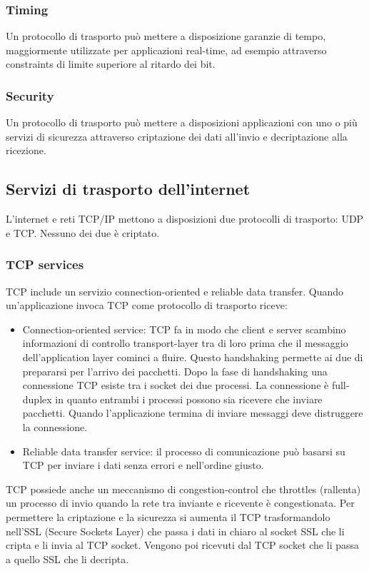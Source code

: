 \subsubsection{Timing}
Un protocollo di trasporto pu\`o mettere a disposizione garanzie di tempo, maggiormente utilizzate per applicazioni real-time, ad esempio attraverso constraints di limite superiore al ritardo dei bit. 
\subsubsection{Security} 
Un protocollo di trasporto pu\`o mettere a disposizioni applicazioni con uno o pi\`u servizi di sicurezza attraverso criptazione dei dati all'invio e decriptazione alla ricezione. 
\subsection{Servizi di trasporto dell'internet}
L'internet e reti TCP/IP mettono a disposizioni due protocolli di trasporto: UDP e TCP.  Nessuno dei due \`e criptato.
\subsubsection{TCP services}
TCP include un servizio connection-oriented e reliable data transfer. Quando un'applicazione invoca TCP come protocollo di trasporto riceve:
\begin{itemize}
\item Connection-oriented service: TCP fa in modo che client e server scambino informazioni di controllo transport-layer tra di loro prima che il messaggio dell'application layer cominci a fluire. Questo 
handshaking permette ai due di prepararsi per l'arrivo dei pacchetti. Dopo la fase di handshaking una connessione TCP esiste tra i socket dei due processi. La connessione \`e full-duplex in quanto 
entrambi i processi possono sia ricevere che inviare pacchetti. Quando l'applicazione termina di inviare messaggi deve distruggere la connessione.
\item Reliable data transfer service: il processo di comunicazione pu\`o basarsi su TCP per inviare i dati senza errori e nell'ordine giusto. 
\end{itemize}
TCP possiede anche un meccanismo di congestion-control che throttles (rallenta) un processo di invio quando la rete tra inviante e ricevente \`e congestionata. Per permettere la criptazione e la sicurezza
si aumenta il TCP trasformandolo nell'SSL (Secure Sockets Layer) che passa i dati in chiaro al socket SSL che li cripta e li invia al TCP socket. Vengono poi ricevuti dal TCP socket che li passa a quello SSL che li
decripta.
